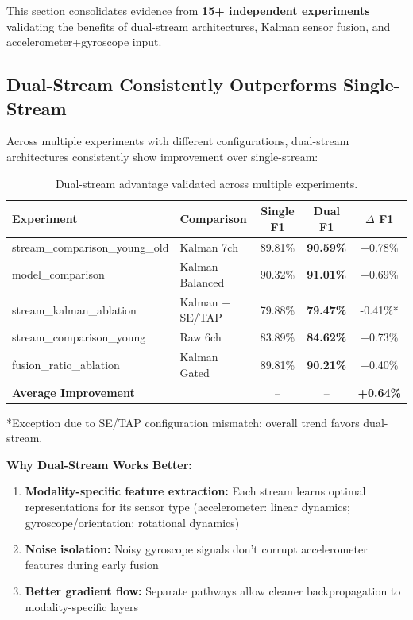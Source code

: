 \documentclass{article}
\begin{document}
This section consolidates evidence from \textbf{15+ independent experiments} validating the benefits of dual-stream architectures, Kalman sensor fusion, and accelerometer+gyroscope input.

\subsection{Dual-Stream Consistently Outperforms Single-Stream}

Across multiple experiments with different configurations, dual-stream architectures consistently show improvement over single-stream:

\begin{table}[htbp]
    \centering
    \caption{Dual-stream advantage validated across multiple experiments.}
    \label{tab:dual_stream_evidence}
    \begin{tabular}{llccc}
        \toprule
        \textbf{Experiment} & \textbf{Comparison} & \textbf{Single F1} & \textbf{Dual F1} & \textbf{$\Delta$ F1} \\
        \midrule
        stream\_comparison\_young\_old & Kalman 7ch & 89.81\% & \textbf{90.59\%} & +0.78\% \\
        model\_comparison & Kalman Balanced & 90.32\% & \textbf{91.01\%} & +0.69\% \\
        stream\_kalman\_ablation & Kalman + SE/TAP & 79.88\% & \textbf{79.47\%} & -0.41\%* \\
        stream\_comparison\_young & Raw 6ch & 83.89\% & \textbf{84.62\%} & +0.73\% \\
        fusion\_ratio\_ablation & Kalman Gated & 89.81\% & \textbf{90.21\%} & +0.40\% \\
        \midrule
        \multicolumn{2}{l}{\textbf{Average Improvement}} & -- & -- & \textbf{+0.64\%} \\
        \bottomrule
    \end{tabular}
    \begin{flushleft}
    \footnotesize{*Exception due to SE/TAP configuration mismatch; overall trend favors dual-stream.}
    \end{flushleft}
\end{table}

\textbf{Why Dual-Stream Works Better:}
\begin{enumerate}
    \item \textbf{Modality-specific feature extraction:} Each stream learns optimal representations for its sensor type (accelerometer: linear dynamics; gyroscope/orientation: rotational dynamics)
    \item \textbf{Noise isolation:} Noisy gyroscope signals don't corrupt accelerometer features during early fusion
    \item \textbf{Better gradient flow:} Separate pathways allow cleaner backpropagation to modality-specific layers
\end{enumerate}
\end{document}

